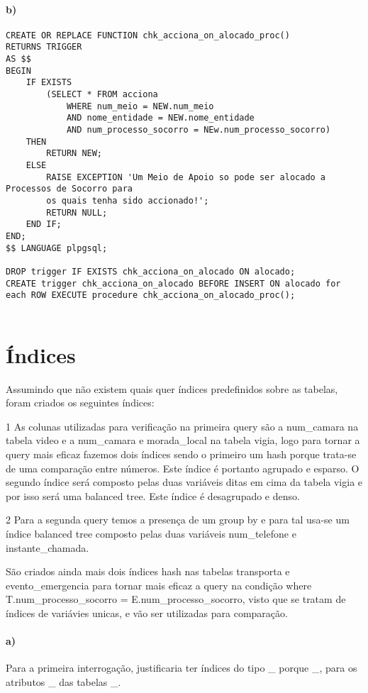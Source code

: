 \documentclass[10pt,a4paper]{article}
\begin{document}
\paragraph{b)}
\begin{verbatim}
CREATE OR REPLACE FUNCTION chk_acciona_on_alocado_proc()
RETURNS TRIGGER
AS $$
BEGIN
    IF EXISTS
        (SELECT * FROM acciona
            WHERE num_meio = NEW.num_meio
            AND nome_entidade = NEW.nome_entidade
            AND num_processo_socorro = NEw.num_processo_socorro)
    THEN
        RETURN NEW;
    ELSE
        RAISE EXCEPTION 'Um Meio de Apoio so pode ser alocado a Processos de Socorro para
        os quais tenha sido accionado!';
        RETURN NULL;
    END IF;
END;
$$ LANGUAGE plpgsql;

DROP trigger IF EXISTS chk_acciona_on_alocado ON alocado;
CREATE trigger chk_acciona_on_alocado BEFORE INSERT ON alocado for each ROW EXECUTE procedure chk_acciona_on_alocado_proc();
    
\end{verbatim}
\section{Índices}
Assumindo que não existem quais quer índices predefinidos sobre as tabelas, foram criados os seguintes índices: 

1  As colunas utilizadas para verificação na primeira query são a num_camara na tabela video e a num_camara e morada_local na tabela vigia, logo para tornar a query mais eficaz fazemos dois índices sendo o primeiro um hash porque trata-se de uma comparação entre números. Este índice é portanto agrupado e esparso. O segundo índice será composto pelas duas variáveis ditas em cima da tabela vigia e por isso será uma balanced tree.  Este índice é desagrupado e denso. 

2 Para a segunda query temos a presença de um group by e para tal usa-se um índice balanced tree composto pelas duas variáveis num_telefone e instante_chamada. 

São criados ainda mais dois índices hash nas tabelas transporta e evento_emergencia para tornar mais eficaz a query na condição where T.num_processo_socorro = E.num_processo_socorro, visto que se tratam de índices de variávies unicas, e vão ser utilizadas para comparação. 

\paragraph{a)}
Para a primeira interrogação, justificaria ter índices do tipo \_ porque \_, para os atributos \_ das tabelas \_.
\end{document}
